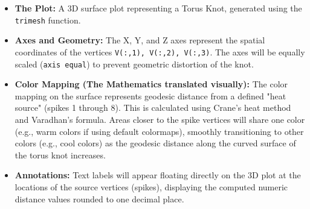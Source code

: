 \begin{itemize}
    \item \textbf{The Plot:} A 3D surface plot representing a Torus Knot, generated using the \texttt{trimesh} function.
    \item \textbf{Axes and Geometry:} The X, Y, and Z axes represent the spatial coordinates of the vertices \texttt{V(:,1), V(:,2), V(:,3)}. The axes will be equally scaled (\texttt{axis equal}) to prevent geometric distortion of the knot.
    \item \textbf{Color Mapping (The Mathematics translated visually):} The color mapping on the surface represents geodesic distance from a defined "heat source" (spikes 1 through 8). This is calculated using Crane's heat method and Varadhan's formula. Areas closer to the spike vertices will share one color (e.g., warm colors if using default colormaps), smoothly transitioning to other colors (e.g., cool colors) as the geodesic distance along the curved surface of the torus knot increases.
    \item \textbf{Annotations:} Text labels will appear floating directly on the 3D plot at the locations of the source vertices (spikes), displaying the computed numeric distance values rounded to one decimal place.
\end{itemize}
